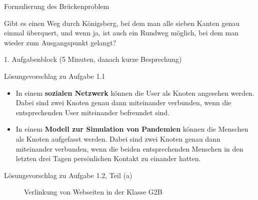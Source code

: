 \begin{frame}[fragile]{Formulierung des Brückenproblem}
\begin{mydefinition}
Gibt es einen Weg durch Königsberg, bei dem man alle sieben Kanten genau einmal überquert, und wenn ja, ist auch ein Rundweg möglich, bei dem man wieder zum Ausgangspunkt gelangt?
\end{mydefinition}
\end{frame}


\begin{frame}[fragile]{1. Aufgabenblock (5 Minuten, danach kurze Besprechung)}
\begin{center}
\end{center}
\end{frame}

\begin{frame}[fragile]{Lösungsvorschlag zu Aufgabe 1.1}
\begin{itemize}[<+->]
    \item In einem \textbf{sozialen Netzwerk} können die User als Knoten angesehen werden. Dabei sind zwei Knoten genau dann miteinander verbunden, wenn die entsprechenden User miteinander befreundet sind.
    \item In einem \textbf{Modell zur Simulation von Pandemien} können die Menschen als Knoten aufgefasst werden. Dabei sind zwei Knoten genau dann miteinander verbunden, wenn die beiden entsprechenden Menschen in den letzten drei Tagen persönlichen Kontakt zu einander hatten.
\end{itemize}
\end{frame}

\begin{frame}[fragile]{Lösungsvorschlag zu Aufgabe 1.2, Teil (a)}
\begin{figure}[H]
\centering
{}
    \caption*{Verlinkung von Webseiten in der Klasse G2B}
\end{figure}
\end{frame}

